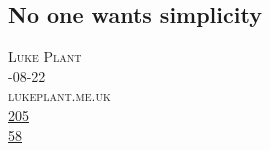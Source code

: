 \documentclass[10pt,a4paper]{article}
\begin{document}
\subsection{No one wants simplicity}
\noindent\begin{minipage}[t]{0.20\linewidth}
\vspace{0pt}
\noindent\textsc{\footnotesize
{\scriptsize\faUser}\space 
Luke Plant \\
{\scriptsize\faCalendar}-08-22 \\
{\scriptsize\faGlobe}\space 
lukeplant.me.uk \\
{\scriptsize\faThumbsOUp}\space 
\href{http://news.ycombinator.com/item?id=37229435\&utm\_term=comment}{205} \\
{\scriptsize\faComments}\space 
\href{http://news.ycombinator.com/item?id=37229435\&utm\_term=comment}{58} \\
}
\end{minipage} 
\end{document}
